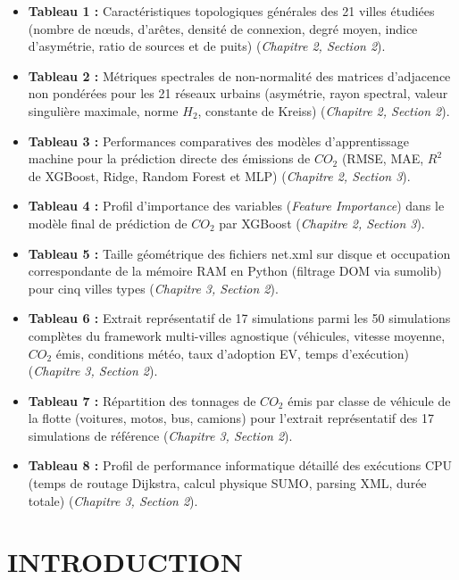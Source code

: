 \documentclass[10pt, a4paper]{article}
\providecommand{\tightlist}{}
\begin{document}
\begin{itemize}
\tightlist
\item
  \textbf{Tableau 1 :} Caractéristiques topologiques générales des 21
  villes étudiées (nombre de nœuds, d'arêtes, densité de connexion,
  degré moyen, indice d'asymétrie, ratio de sources et de puits)
  (\emph{Chapitre 2, Section 2}).
\item
  \textbf{Tableau 2 :} Métriques spectrales de non-normalité des
  matrices d'adjacence non pondérées pour les 21 réseaux urbains
  (asymétrie, rayon spectral, valeur singulière maximale, norme \(H_2\),
  constante de Kreiss) (\emph{Chapitre 2, Section 2}).
\item
  \textbf{Tableau 3 :} Performances comparatives des modèles
  d'apprentissage machine pour la prédiction directe des émissions de
  \(CO_2\) (RMSE, MAE, \(R^2\) de XGBoost, Ridge, Random Forest et MLP)
  (\emph{Chapitre 2, Section 3}).
\item
  \textbf{Tableau 4 :} Profil d'importance des variables (\emph{Feature
  Importance}) dans le modèle final de prédiction de \(CO_2\) par
  XGBoost (\emph{Chapitre 2, Section 3}).
\item
  \textbf{Tableau 5 :} Taille géométrique des fichiers net.xml sur
  disque et occupation correspondante de la mémoire RAM en Python
  (filtrage DOM via sumolib) pour cinq villes types (\emph{Chapitre 3,
  Section 2}).
\item
  \textbf{Tableau 6 :} Extrait représentatif de 17 simulations parmi les
  50 simulations complètes du framework multi-villes agnostique
  (véhicules, vitesse moyenne, \(CO_2\) émis, conditions météo, taux
  d'adoption EV, temps d'exécution) (\emph{Chapitre 3, Section 2}).
\item
  \textbf{Tableau 7 :} Répartition des tonnages de \(CO_2\) émis par
  classe de véhicule de la flotte (voitures, motos, bus, camions) pour
  l'extrait représentatif des 17 simulations de référence
  (\emph{Chapitre 3, Section 2}).
\item
  \textbf{Tableau 8 :} Profil de performance informatique détaillé des
  exécutions CPU (temps de routage Dijkstra, calcul physique SUMO,
  parsing XML, durée totale) (\emph{Chapitre 3, Section 2}).
\end{itemize}

\newpage

\section{INTRODUCTION}\label{introduction}
\end{document}
